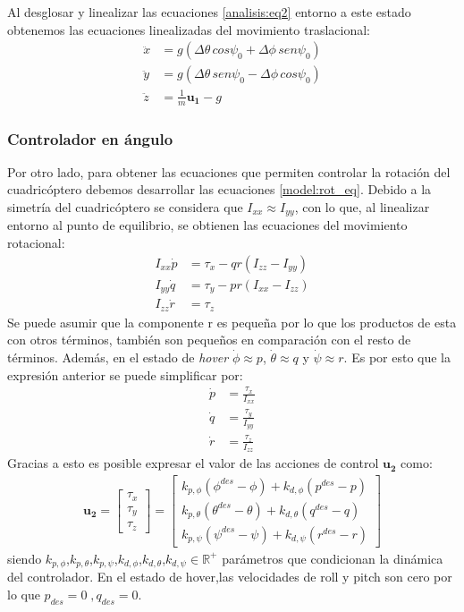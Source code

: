 Al desglosar y linealizar las ecuaciones \ref{analisis:eq2} entorno a este estado obtenemos las ecuaciones linealizadas del movimiento traslacional:
\begin{align}
	\ddot{x} &= g (\Delta\theta\, cos \psi_0 + \Delta\phi\,sen\psi_0)\nonumber \\
	\ddot{y} &= g(\Delta\theta\, sen \psi_0  - \Delta\phi\,cos\psi_0) \label{eq:control1}\\
	\ddot{z} &= \frac{1}{m}\mathbf{u_1}-g\nonumber
\end{align}

\subsubsection{Controlador en ángulo}
Por otro lado, para obtener las ecuaciones que permiten controlar la rotación del cuadricóptero debemos desarrollar las ecuaciones \ref{model:rot_eq}. Debido a la simetría del cuadricóptero se considera que $I_{xx} \approx I_{yy}$, con lo que, al linealizar entorno al punto de equilibrio, se obtienen las ecuaciones del movimiento rotacional:
\begin{align}
	I_ {xx} \dot p &= 	\tau_x - qr(I_{zz}-I_{yy})\nonumber\\
	I_ {yy} \dot q &= 	\tau_y - pr(I_{xx}-I_{zz})\label{eq:control2}\\
	I_ {zz} \dot r &= 	\tau_z \nonumber
\end{align}
Se puede asumir que la componente r es pequeña por lo que los productos de esta con otros términos, también son pequeños en comparación con el resto de términos. Además, en el estado de \textit{hover} $\dot{\phi}\approx p$, $\dot{\theta}\approx q$ y $\dot{\psi}\approx r$. Es por esto que la expresión anterior se puede simplificar por:
\begin{align}
	\dot p &= \frac{\tau_x}{I_ {xx}} \nonumber\\
	\dot q &= \frac{\tau_y}{I_ {yy}}\label{eq:control3}\\
	\dot r &= \frac{\tau_z}{I_ {zz}}\nonumber
\end{align}
Gracias a esto es posible expresar el valor de las acciones de control $\mathbf{u_2}$ como:
\begin{align}
	\label{eq:u2_linearized}
	\mathbf{u_2} =
	\begin{bmatrix}
\tau_x \\
\tau_y \\
\tau_z 
	\end{bmatrix}=
	\begin{bmatrix}
	k_{p,\phi}(\phi^{des}-\phi) + k_{d,\phi}(p^{des}-p)\\
	k_{p,\theta}(\theta^{des}-\theta) + k_{d,\theta}(q^{des}-q)\\
	k_{p,\psi}(\psi^{des}-\psi) + k_{d,\psi}(r^{des}-r)		
\end{bmatrix}
\end{align}
siendo $k_{p,\phi}$,$k_{p,\theta}$,$k_{p,\psi}$,$k_{d,\phi}$,$k_{d,\theta}$,$k_{d,\psi} \in \mathbb{R}^+$ parámetros que condicionan la dinámica del controlador.
En el estado de hover,las velocidades de roll y pitch son cero por lo que $p_{des} = 0\;, q_{des} = 0$.

